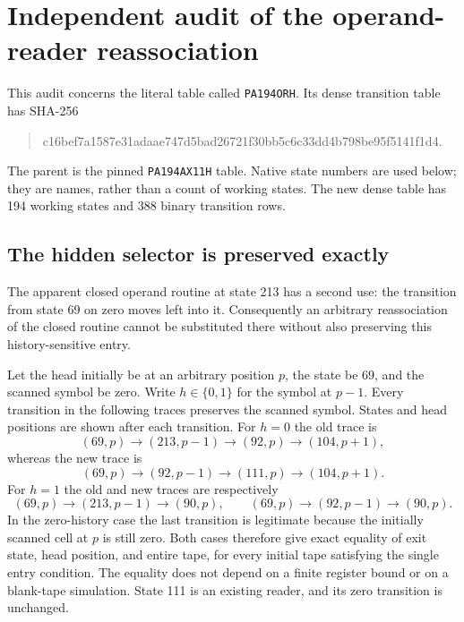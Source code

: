 \section{Independent audit of the operand-reader reassociation}
\label{sec:orh-independent}
This audit concerns the literal table called \texttt{PA194ORH}. Its dense
transition table has SHA-256
\begin{quote}\small\ttfamily
c16bef7a1587e31adaae747d5bad26721f30bb5c6c33dd4b798be95f5141f1d4.
\end{quote}
The parent is the pinned \texttt{PA194AX11H} table. Native state numbers
are used below; they are names, rather than a count of working states.
The new dense table has 194 working states and 388 binary transition rows.

\subsection{The hidden selector is preserved exactly}
The apparent closed operand routine at state 213 has a second use:
the transition from state 69 on zero moves left into it. Consequently
an arbitrary reassociation of the closed routine cannot be substituted
there without also preserving this history-sensitive entry.

Let the head initially be at an arbitrary position $p$, the state be 69,
and the scanned symbol be zero. Write $h\in\{0,1\}$ for the symbol at
$p-1$. Every transition in the following traces preserves the scanned
symbol. States and head positions are shown after each transition.
For $h=0$ the old trace is
\[
 (69,p)\longrightarrow(213,p-1)\longrightarrow(92,p)
 \longrightarrow(104,p+1),
\]
whereas the new trace is
\[
 (69,p)\longrightarrow(92,p-1)\longrightarrow(111,p)
 \longrightarrow(104,p+1).
\]
For $h=1$ the old and new traces are respectively
\[
 (69,p)\longrightarrow(213,p-1)\longrightarrow(90,p),
 \qquad
 (69,p)\longrightarrow(92,p-1)\longrightarrow(90,p).
\]
In the zero-history case the last transition is legitimate because the
initially scanned cell at $p$ is still zero. Both cases therefore give
exact equality of exit state, head position, and entire tape, for every
initial tape satisfying the single entry condition. The equality does
not depend on a finite register bound or on a blank-tape simulation.
State 111 is an existing reader, and its zero transition is unchanged.

